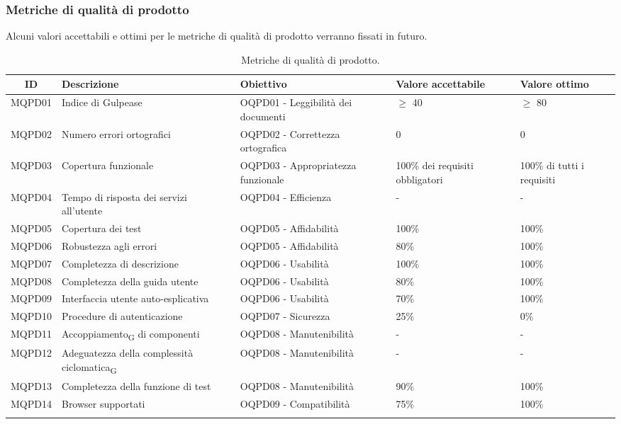 \subsubsection{Metriche di qualità di prodotto}
Alcuni valori accettabili e ottimi per le metriche di qualità di prodotto verranno fissati in futuro.
\begin{center}
	\setlength\extrarowheight{2pt}
	\begin{xltabular}{\textwidth}{|c|X|X|X|X|}
		\hline
		\textbf{ID} & \textbf{Descrizione} & \textbf{Obiettivo} & \textbf{Valore accettabile} & \textbf{Valore ottimo}\\
		\hline
		MQPD01 & Indice di Gulpease & OQPD01 - Leggibilità dei documenti & $\geq$ 40 & $\geq$ 80 \\
		\hline
		MQPD02 & Numero errori ortografici & OQPD02 - Correttezza ortografica & 0 & 0 \\
		\hline
		MQPD03 & Copertura funzionale & OQPD03 - Appropriatezza funzionale & 100\% dei requisiti obbligatori & 100\% di tutti i requisiti\\
		\hline
		MQPD04 & Tempo di risposta dei servizi all'utente & OQPD04 - Efficienza & - & - \\
		\hline
		MQPD05 & Copertura dei test & OQPD05 - Affidabilità & 100\% & 100\% \\
		\hline
		MQPD06 & Robustezza agli errori & OQPD05 - Affidabilità & 80\% & 100\% \\
		\hline
		MQPD07 & Completezza di descrizione & OQPD06 - Usabilità & 100\% &  100\% \\
		\hline
		MQPD08 & Completezza della guida utente & OQPD06 - Usabilità & 80\% &  100\% \\
		\hline
		MQPD09 & Interfaccia utente auto-esplicativa & OQPD06 - Usabilità & 70\% &  100\% \\
		\hline
		MQPD10 & Procedure di autenticazione & OQPD07 - Sicurezza & 25\% &  0\% \\
		\hline
		MQPD11 & Accoppiamento\textsubscript{G} di componenti & OQPD08 - Manutenibilità & - & - \\
		\hline
		MQPD12 & Adeguatezza della complessità ciclomatica\textsubscript{G} & OQPD08 - Manutenibilità & - & - \\
		\hline
		MQPD13 & Completezza della funzione di test & OQPD08 - Manutenibilità & 90\% & 100\% \\
		\hline
		MQPD14 & Browser supportati & OQPD09 - Compatibilità & 75\% & 100\% \\
		\hline
		\caption{Metriche di qualità di prodotto.}
	\end{xltabular}
\end{center}
